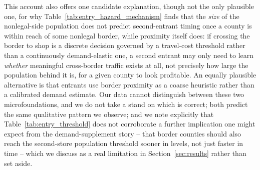 \documentclass[12pt]{article}
\begin{document}
This account also offers one candidate explanation, though not the only plausible one, for why
Table~\ref{tab:entry_hazard_mechanism} finds that the \emph{size} of the nonlegal-side population does not
predict second-entrant timing once a county is within reach of some nonlegal border, while proximity itself
does: if crossing the border to shop is a discrete decision governed by a travel-cost threshold rather than
a continuously demand-elastic one, a second entrant may only need to learn \emph{whether} meaningful
cross-border traffic exists at all, not precisely how large the population behind it is, for a given county
to look profitable. An equally plausible alternative is that entrants use border proximity as a coarse
heuristic rather than a calibrated demand estimate. Our data cannot distinguish between these two
microfoundations, and we do not take a stand on which is correct; both predict the same qualitative pattern
we observe; and we note explicitly that Table~\ref{tab:entry_threshold} does not corroborate a further
implication one might expect from the demand-supplement story -- that border counties should also reach the
second-store population threshold sooner in levels, not just faster in time -- which we discuss as a real
limitation in Section~\ref{sec:results} rather than set aside.
\end{document}
